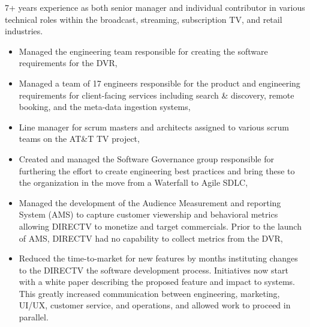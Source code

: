 
\par{ 7+ years experience as both senior manager and individual contributor in
  various technical roles within the broadcast, streaming, subscription TV, and
  retail industries. }

\begin{itemize}
  \item Managed the engineering team responsible for creating the software
    requirements for the DVR\@,
  \item Managed a team of 17 engineers responsible for the product and
    engineering requirements for client-facing services including search \&
    discovery, remote booking, and the meta-data ingestion systems,
  \item Line manager for scrum masters and architects assigned to various scrum
    teams on the AT\&T TV project,
  \item Created and managed the Software Governance group responsible for
    furthering the effort to create engineering best practices and bring these
    to the organization in the move from a Waterfall to Agile SDLC\@,
  \item Managed the development of the Audience Measurement and reporting System
    (AMS) to capture customer viewership and behavioral metrics allowing DIRECTV
    to monetize and target commercials. Prior to the launch of AMS, DIRECTV had
    no capability to collect metrics from the DVR\@,
  \item Reduced the time-to-market for new features by months instituting
    changes to the DIRECTV the software development process. Initiatives now
    start with a white paper describing the proposed feature and impact to
    systems. This greatly increased communication between engineering,
    marketing, UI/UX, customer service, and operations, and allowed work to
    proceed in parallel.
\end{itemize}

